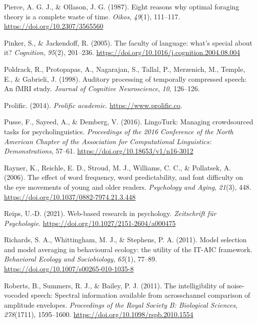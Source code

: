 \documentclass[a4paper, nobind]{templates/ociamthesis}
\newlength{\cslhangindent}
\newenvironment{CSLReferences}[2] %
 {%
  \setlength{\parindent}{0pt}
  \ifodd #1
  \let\oldpar\par
  \def\par{\hangindent=\cslhangindent\oldpar}
  \fi
  \setlength{\parskip}{1mm}
  \setlength{\baselineskip}{6mm}
 }%
 {}
\begin{document}
\begin{CSLReferences}{1}{0}
\leavevmode{}%
Pierce, A. G. J., \& Ollason, J. G. (1987). {Eight reasons why optimal foraging theory is a complete waste of time}. \emph{Oikos}, \emph{49}(1), 111--117. \url{https://doi.org/10.2307/3565560}

\leavevmode{}%
Pinker, S., \& Jackendoff, R. (2005). The faculty of language: what's special about it? \emph{Cognition}, \emph{95}(2), 201--236. \url{https://doi.org/10.1016/j.cognition.2004.08.004}

\leavevmode{}%
Poldrack, R., Protopapas, A., Nagarajan, S., Tallal, P., Merzenich, M., Temple, E., \& Gabrieli, J. (1998). Auditory processing of temporally compressed speech: An fMRI study. \emph{Journal of Cognitive Neuroscience}, \emph{10}, 126--126.

\leavevmode{}%
Prolific. (2014). \emph{Prolific academic}. \url{https://www.prolific.co}.

\leavevmode{}%
Pusse, F., Sayeed, A., \& Demberg, V. (2016). {LingoTurk: Managing crowdsourced tasks for psycholinguistics}. \emph{Proceedings of the 2016 Conference of the North American Chapter of the Association for Computational Linguistics: Demonstrations}, 57--61. \url{https://doi.org/10.18653/v1/n16-3012}

\leavevmode{}%
Rayner, K., Reichle, E. D., Stroud, M. J., Williams, C. C., \& Pollatsek, A. (2006). The effect of word frequency, word predictability, and font difficulty on the eye movements of young and older readers. \emph{Psychology and Aging}, \emph{21}(3), 448. \url{https://doi.org/10.1037/0882-7974.21.3.448}

\leavevmode{}%
Reips, U.-D. (2021). Web-based research in psychology. \emph{Zeitschrift f{ü}r Psychologie}. \url{https://doi.org/10.1027/2151-2604/a000475}

\leavevmode{}%
Richards, S. A., Whittingham, M. J., \& Stephens, P. A. (2011). Model selection and model averaging in behavioural ecology: the utility of the IT-AIC framework. \emph{Behavioral Ecology and Sociobiology}, \emph{65}(1), 77--89. \url{https://doi.org/10.1007/s00265-010-1035-8}

\leavevmode{}%
Roberts, B., Summers, R. J., \& Bailey, P. J. (2011). The intelligibility of noise-vocoded speech: Spectral information available from acrosschannel comparison of amplitude envelopes. \emph{Proceedings of the Royal Society B: Biological Sciences}, \emph{278}(1711), 1595--1600. \url{https://doi.org/10.1098/rspb.2010.1554}


\end{CSLReferences}
\end{document}
